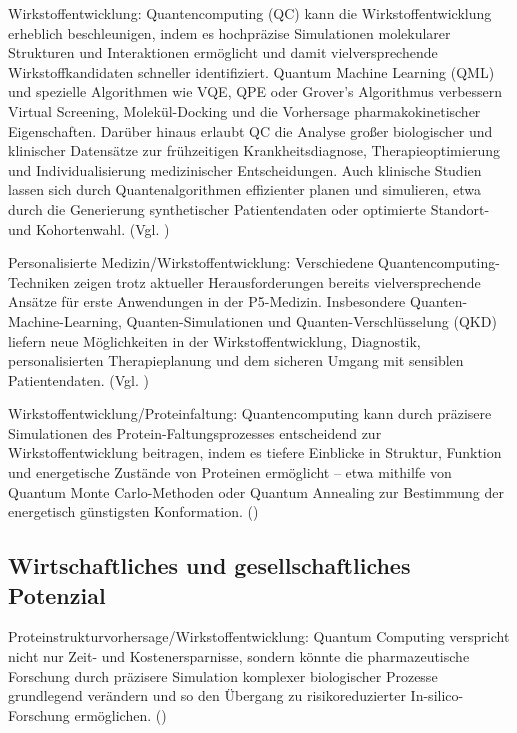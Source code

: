 Wirkstoffentwicklung:
Quantencomputing (QC) kann die Wirkstoffentwicklung erheblich beschleunigen, indem es hochpräzise Simulationen molekularer Strukturen und Interaktionen ermöglicht und damit vielversprechende Wirkstoffkandidaten schneller identifiziert. Quantum Machine Learning (QML) und spezielle Algorithmen wie VQE, QPE oder Grover’s Algorithmus verbessern Virtual Screening, Molekül-Docking und die Vorhersage pharmakokinetischer Eigenschaften. Darüber hinaus erlaubt QC die Analyse großer biologischer und klinischer Datensätze zur frühzeitigen Krankheitsdiagnose, Therapieoptimierung und Individualisierung medizinischer Entscheidungen. Auch klinische Studien lassen sich durch Quantenalgorithmen effizienter planen und simulieren, etwa durch die Generierung synthetischer Patientendaten oder optimierte Standort- und Kohortenwahl. (Vgl. \cite{bertl_quantum_2025})

Personalisierte Medizin/Wirkstoffentwicklung:
Verschiedene Quantencomputing-Techniken zeigen trotz aktueller Herausforderungen bereits vielversprechende Ansätze für erste Anwendungen in der P5-Medizin. Insbesondere Quanten-Machine-Learning, Quanten-Simulationen und Quanten-Verschlüsselung (QKD) liefern neue Möglichkeiten in der Wirkstoffentwicklung, Diagnostik, personalisierten Therapieplanung und dem sicheren Umgang mit sensiblen Patientendaten. (Vgl. \cite{bertl_quantum_2025})

Wirkstoffentwicklung/Proteinfaltung:
Quantencomputing kann durch präzisere Simulationen des Protein-Faltungsprozesses entscheidend zur Wirkstoffentwicklung beitragen, indem es tiefere Einblicke in Struktur, Funktion und energetische Zustände von Proteinen ermöglicht – etwa mithilfe von Quantum Monte Carlo-Methoden oder Quantum Annealing zur Bestimmung der energetisch günstigsten Konformation. (\cite{bertl_quantum_2025})

\subsection{Wirtschaftliches und gesellschaftliches Potenzial}

Proteinstrukturvorhersage/Wirkstoffentwicklung:
Quantum Computing verspricht nicht nur Zeit- und Kostenersparnisse, sondern könnte die pharmazeutische Forschung durch präzisere Simulation komplexer biologischer Prozesse grundlegend verändern und so den Übergang zu risikoreduzierter In-silico-Forschung ermöglichen. (\cite{dhande_quantum_2023})

